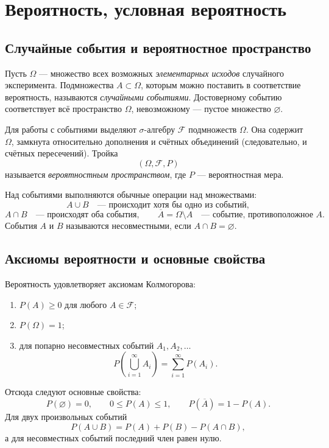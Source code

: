 \section{Вероятность, условная вероятность}
\label{sec:probability-and-conditional-probability}

\subsection{Случайные события и вероятностное пространство}

Пусть $\Omega$ --- множество всех возможных \emph{элементарных исходов} случайного
эксперимента. Подмножества $A\subset\Omega$, которым можно поставить в соответствие
вероятность, называются \emph{случайными событиями}. Достоверному событию соответствует
всё пространство $\Omega$, невозможному --- пустое множество $\varnothing$.

Для работы с событиями выделяют $\sigma$-алгебру $\mathcal F$ подмножеств $\Omega$.
Она содержит $\Omega$, замкнута относительно дополнения и счётных объединений
(следовательно, и счётных пересечений). Тройка
\[
    (\Omega,\mathcal F,P)
\]
называется \emph{вероятностным пространством}, где $P$ --- вероятностная мера.

Над событиями выполняются обычные операции над множествами:
\[
    A\cup B \quad\text{--- происходит хотя бы одно из событий},
\]
\[
    A\cap B \quad\text{--- происходят оба события},
    \qquad
    \overline A=\Omega\setminus A \quad\text{--- событие, противоположное $A$}.
\]
События $A$ и $B$ называются несовместными, если $A\cap B=\varnothing$.

\subsection{Аксиомы вероятности и основные свойства}

Вероятность удовлетворяет аксиомам Колмогорова:
\begin{enumerate}
    \item $P(A)\geq 0$ для любого $A\in\mathcal F$;
    \item $P(\Omega)=1$;
    \item для попарно несовместных событий $A_1,A_2,\ldots$
    \[
        P\!\left(\bigcup_{i=1}^{\infty}A_i\right)
        =\sum_{i=1}^{\infty}P(A_i).
    \]
\end{enumerate}

Отсюда следуют основные свойства:
\[
    P(\varnothing)=0,
    \qquad
    0\leq P(A)\leq 1,
    \qquad
    P(\overline A)=1-P(A).
\]
Для двух произвольных событий
\[
    P(A\cup B)=P(A)+P(B)-P(A\cap B),
\]
а для несовместных событий последний член равен нулю.

